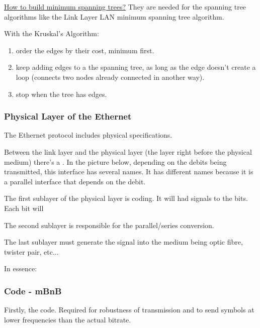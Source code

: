 \ul{How to build minimum spanning trees?}
They are needed for the spanning tree algorithms like the Link Layer LAN minimum spanning tree algorithm.

With the Kruskal's Algorithm: %
\begin{enumerate}
    \item order the edges by their cost, minimum first.
    \item keep adding edges to a the spanning tree, as long as the edge doesn't create a loop (connects two nodes already connected in another way).
    \item stop when the tree has  edges.
\end{enumerate}





\subsubsection{Physical Layer of the Ethernet}

The Ethernet protocol includes physical specifications.

Between the link layer and the physical layer (the layer right before the physical medium) there's a . In the picture below, depending on the debits being transmitted, this interface has several names. It has different names because it is a parallel interface that depends on the debit.



The first sublayer of the physical layer is coding. It will had signals to the bits. Each bit will 

The second sublayer is responsible for the parallel/series conversion.

The last sublayer must generate the signal into the medium being optic fibre, twister pair, etc...

In essence:





\subsubsection*{Code - mBnB}

Firstly, the code. Required for robustness of transmission and to send symbols at lower frequencies than the actual bitrate.




